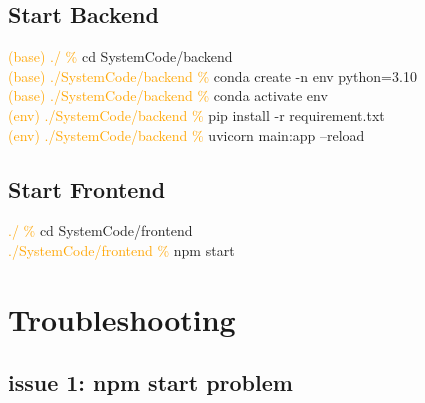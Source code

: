 \documentclass[12pt, a4paper]{article}
\begin{document}
    \subsection{Start Backend}
    
        \begin{monoblock}
            \textcolor{orange}{(base) ./ \%} cd SystemCode/backend \\
            \textcolor{orange}{(base) ./SystemCode/backend \%} conda create -n env python=3.10 \\
            \textcolor{orange}{(base) ./SystemCode/backend \%} conda activate env \\
            \textcolor{orange}{(env) ./SystemCode/backend \%} pip install -r requirement.txt \\
            \textcolor{orange}{(env) ./SystemCode/backend \%} uvicorn main:app --reload
        \end{monoblock}
    
    \subsection{Start Frontend}
        
        \begin{monoblock}
            \textcolor{orange}{./ \%} cd SystemCode/frontend \\
            \textcolor{orange}{./SystemCode/frontend \%} npm start
        \end{monoblock}

\section{Troubleshooting}

    \subsection{issue 1: npm start problem}
    
\end{document}
